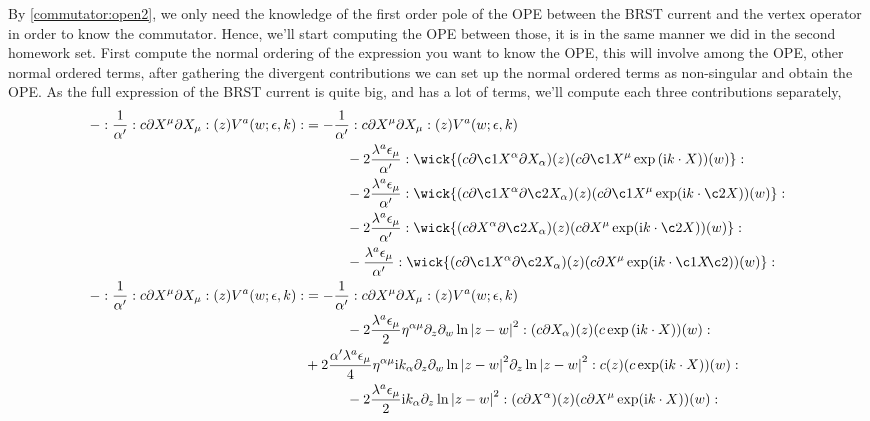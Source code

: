 By \cref{commutator:open2}, we only need the knowledge of the first order pole of the OPE between the BRST current and the vertex operator in 
order to know the commutator. Hence, we'll start computing the OPE between those, it is in the same manner we did in the second 
homework set. First compute the normal ordering of the expression you want to know the OPE, this will involve among 
the OPE, other normal ordered terms, after gathering the divergent contributions we can set up the 
normal ordered terms as non-singular and obtain the OPE. As the full expression of the BRST 
current is quite big, and has a lot of terms, we'll compute each three contributions separately,
\begin{align*}
    -\cnord{\frac{1}{\alpha'}\cnord{c\partial X^\mu\partial X_\mu}\qty(z)V^a\qty(w;\epsilon,k)}&=-\frac{1}{\alpha'}\cnord{c\partial X^\mu\partial X_\mu}\qty(z)V^a\qty(w;\epsilon,k)\\
    &\quad\quad\quad-2\frac{\lambda^a\epsilon_\mu}{\alpha'}\cnord{\wick{(c\partial \c1X^\alpha\partial X_\alpha)\qty(z)(c\partial\c1 X^\mu\exp\qty(\im k\cdot X))\qty(w)}}\\
    &\quad\quad\quad-2\frac{\lambda^a\epsilon_\mu}{\alpha'}\cnord{\wick{(c\partial \c1X^\alpha\partial \c2X_\alpha)\qty(z)(c\partial\c1 X^\mu\exp(\im k\cdot\c2 X))\qty(w)}}\\
    &\quad\quad\quad-2\frac{\lambda^a\epsilon_\mu}{\alpha'}\cnord{\wick{(c\partial X^\alpha\partial \c2X_\alpha)\qty(z)(c\partial X^\mu\exp(\im k\cdot\c2 X))\qty(w)}}\\
    &\quad\quad\quad-\frac{\lambda^a\epsilon_\mu}{\alpha'}\cnord{\wick{(c\partial \c1X^\alpha\partial \c2X_\alpha)\qty(z)(c\partial X^\mu\exp(\im k\cdot\c1 X\mkern-4mu \c2 {\mathclap{\phantom{X}}}))\qty(w)}}\\
    -\cnord{\frac{1}{\alpha'}\cnord{c\partial X^\mu\partial X_\mu}\qty(z)V^a\qty(w;\epsilon,k)}&=-\frac{1}{\alpha'}\cnord{c\partial X^\mu\partial X_\mu}\qty(z)V^a\qty(w;\epsilon,k)\\
    &\quad\quad\quad-2\frac{\lambda^a\epsilon_\mu}{2}\eta^{\alpha\mu}\partial_z\partial_w\ln\abs{z-w}^2\cnord{(c\partial X_\alpha)\qty(z)(c\exp\qty(\im k\cdot X))\qty(w)}\\
    &+2\frac{\alpha'\lambda^a\epsilon_\mu}{4}\eta^{\alpha\mu}\im k_\alpha\partial_z\partial_w\ln\abs{z-w}^2\partial_z\ln\abs{z-w}^2\cnord{c\qty(z)(c\exp(\im k\cdot X))\qty(w)}\\
    &\quad\quad\quad-2\frac{\lambda^a\epsilon_\mu}{2}\im k_\alpha\partial_z\ln\abs{z-w}^2\cnord{(c\partial X^\alpha)\qty(z)(c\partial X^\mu\exp(\im k\cdot X))\qty(w)}\\

\end{align*}
